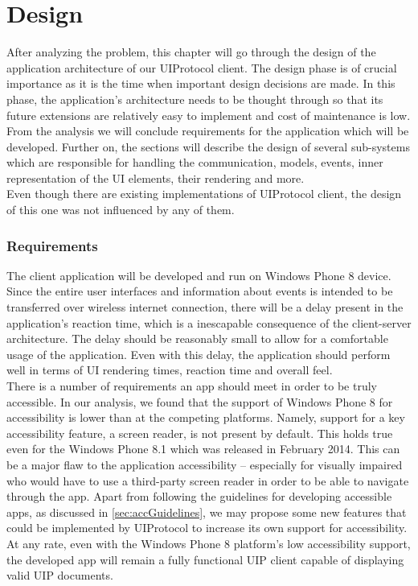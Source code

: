 \chapter{Design}
After analyzing the problem, this chapter will go through the design of the application architecture of our UIProtocol client. The design phase is of crucial importance as it is the time when important design decisions are made. In this phase, the application's architecture needs to be thought through so that its future extensions are relatively easy to implement and cost of maintenance is low.\\
From the analysis we will conclude requirements for the application which will be developed. Further on, the sections will describe the design of several sub-systems which are responsible for handling the communication, models, events, inner representation of the UI elements, their rendering and more.\\
Even though there are existing implementations of UIProtocol client, the design of this one was not influenced by any of them.

\subsection{Requirements}
The client application will be developed and run on Windows Phone 8 device. Since the entire user interfaces and information about events is intended to be transferred over wireless internet connection, there will be a delay present in the application's reaction time, which is a inescapable consequence of the client-server architecture. The delay should be reasonably small to allow for a comfortable usage of the application. Even with this delay, the application should perform well in terms of UI rendering times, reaction time and overall feel.\\
There is a number of requirements an app should meet in order to be truly accessible. In our analysis, we found that the support of Windows Phone 8 for accessibility is lower than at the competing platforms. Namely, support for a key accessibility feature, a screen reader, is not present by default. This holds true even for the Windows Phone 8.1 which was released in February 2014. This can be a major flaw to the application accessibility – especially for visually impaired who would have to use a third-party screen reader in order to be able to navigate through the app. Apart from following the guidelines for developing accessible apps, as discussed in \ref{sec:accGuidelines}, we may propose some new features that could be implemented by UIProtocol to increase its own support for accessibility. At any rate, even with the Windows Phone 8 platform's low accessibility support, the developed app will remain a fully functional UIP client capable of displaying valid UIP documents.


